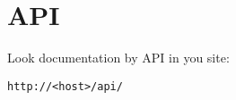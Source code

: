 \newpage
\chapter{API}

Look documentation by API in you site:
\begin{Verbatim}[frame=single]
http://<host>/api/
\end{Verbatim}





